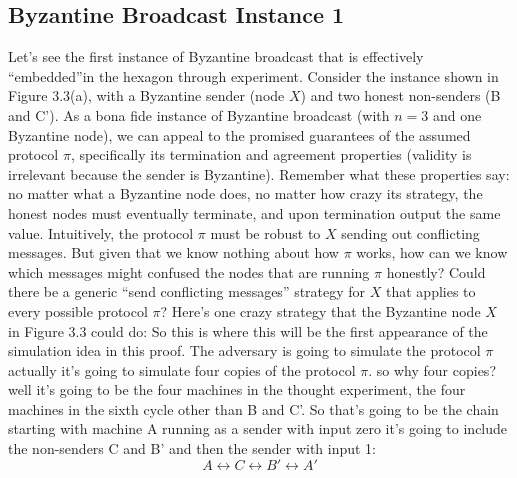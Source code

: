 \subsection{Byzantine Broadcast Instance 1}
Let’s see the first instance of Byzantine broadcast that is effectively “embedded”in the
hexagon through experiment. Consider the instance shown in Figure 3.3(a), with a Byzantine sender (node $X$) and two honest non-senders (B and C'). As a bona fide instance of Byzantine broadcast (with $n = 3$ and one Byzantine node), we can appeal to the promised
guarantees of the assumed protocol $\pi$, specifically its termination and agreement properties
(validity is irrelevant because the sender is Byzantine). Remember what these properties
say: no matter what a Byzantine node does, no matter how crazy its strategy, the honest
nodes must eventually terminate, and upon termination output the same value.
Intuitively, the protocol $\pi$ must be robust to $X$ sending out conflicting messages. But
given that we know nothing about how $\pi$ works, how can we know which messages might
confused the nodes that are running $\pi$ honestly? Could there be a generic “send conflicting
messages” strategy for $X$ that applies to every possible protocol $\pi$?
Here’s one crazy strategy that the Byzantine node $X$ in Figure 3.3 could do:
So this is where this will be the first appearance of the simulation idea in this proof. The adversary is
going to simulate the protocol $\pi$ actually it's going to simulate four copies of the protocol $\pi$.
so why four copies? well it's going to be the four machines in the thought experiment, the four machines in the sixth cycle other than B and C'. So that's going to be the chain starting with machine A running as a
sender with input zero it's going to include the non-senders C and B' and then the sender with input 1:
$$A \leftrightarrow C \leftrightarrow B' \leftrightarrow A'$$

